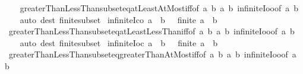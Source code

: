 \begin{isabellebody}
%
\isadelimproof
\ \ %
\endisadelimproof
%
\isatagproof
{}\isamarkupfalse%
\ greaterThanLessThan{\isacharunderscore}{\kern0pt}subseteq{\isacharunderscore}{\kern0pt}atLeastAtMost{\isacharunderscore}{\kern0pt}iff{\isacharbrackleft}{\kern0pt}of\ a\ b\ a\ b{\isacharbrackright}{\kern0pt}\ infinite{\isacharunderscore}{\kern0pt}Ioo{\isacharbrackleft}{\kern0pt}of\ a\ b{\isacharbrackright}{\kern0pt}\isanewline
\ \ \isamarkupfalse%
\ {\isacharparenleft}{\kern0pt}auto\ dest{\isacharcolon}{\kern0pt}\ finite{\isacharunderscore}{\kern0pt}subset{\isacharparenright}{\kern0pt}%
\endisatagproof
{\isafoldproof}%
%
\isadelimproof
\isanewline
%
\endisadelimproof
\isanewline
{}\isamarkupfalse%
\ infinite{\isacharunderscore}{\kern0pt}Ico{\isacharcolon}{\kern0pt}\ {\isachardoublequoteopen}a\ {\isacharless}{\kern0pt}\ b\ {\isasymLongrightarrow}\ {\isasymnot}\ finite\ {\isacharbraceleft}{\kern0pt}a\ {\isachardot}{\kern0pt}{\isachardot}{\kern0pt}{\isacharless}{\kern0pt}\ b{\isacharbraceright}{\kern0pt}{\isachardoublequoteclose}\isanewline
%
\isadelimproof
\ \ %
\endisadelimproof
%
\isatagproof
{}\isamarkupfalse%
\ greaterThanLessThan{\isacharunderscore}{\kern0pt}subseteq{\isacharunderscore}{\kern0pt}atLeastLessThan{\isacharunderscore}{\kern0pt}iff{\isacharbrackleft}{\kern0pt}of\ a\ b\ a\ b{\isacharbrackright}{\kern0pt}\ infinite{\isacharunderscore}{\kern0pt}Ioo{\isacharbrackleft}{\kern0pt}of\ a\ b{\isacharbrackright}{\kern0pt}\isanewline
\ \ \isamarkupfalse%
\ {\isacharparenleft}{\kern0pt}auto\ dest{\isacharcolon}{\kern0pt}\ finite{\isacharunderscore}{\kern0pt}subset{\isacharparenright}{\kern0pt}%
\endisatagproof
{\isafoldproof}%
%
\isadelimproof
\isanewline
%
\endisadelimproof
\isanewline
{}\isamarkupfalse%
\ infinite{\isacharunderscore}{\kern0pt}Ioc{\isacharcolon}{\kern0pt}\ {\isachardoublequoteopen}a\ {\isacharless}{\kern0pt}\ b\ {\isasymLongrightarrow}\ {\isasymnot}\ finite\ {\isacharbraceleft}{\kern0pt}a\ {\isacharless}{\kern0pt}{\isachardot}{\kern0pt}{\isachardot}{\kern0pt}\ b{\isacharbraceright}{\kern0pt}{\isachardoublequoteclose}\isanewline
%
\isadelimproof
\ \ %
\endisadelimproof
%
\isatagproof
{}\isamarkupfalse%
\ greaterThanLessThan{\isacharunderscore}{\kern0pt}subseteq{\isacharunderscore}{\kern0pt}greaterThanAtMost{\isacharunderscore}{\kern0pt}iff{\isacharbrackleft}{\kern0pt}of\ a\ b\ a\ b{\isacharbrackright}{\kern0pt}\ infinite{\isacharunderscore}{\kern0pt}Ioo{\isacharbrackleft}{\kern0pt}of\ a\ b{\isacharbrackright}{\kern0pt}\isanewline
\ \ \isamarkupfalse%

\end{isabellebody}
